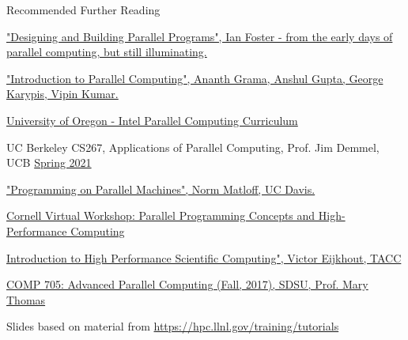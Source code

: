 \documentclass[10pt,t]{beamer}
\begin{document}
%

\begin{frame}{Recommended Further Reading}
  \begin{itemize}
  \small{
    \item \href{http://www.mcs.anl.gov/~itf/dbpp/}{"Designing and Building Parallel Programs", Ian Foster - from the early days of parallel computing, but still illuminating.}
    \item \href{http://www-users.cs.umn.edu/~karypis/parbook/}{"Introduction to Parallel Computing", Ananth Grama, Anshul Gupta, George Karypis, Vipin Kumar.}
    \item \href{https://ipcc.cs.uoregon.edu/curriculum.html}{University of Oregon - Intel Parallel Computing Curriculum}
    \item UC Berkeley CS267, Applications of Parallel Computing, Prof. Jim Demmel, UCB \href{https://sites.google.com/lbl.gov/cs267-spr2021}{Spring 2021}
    \item \href{http://heather.cs.ucdavis.edu/~matloff/158/PLN/ParProcBookS2011.pdf}{"Programming on Parallel Machines", Norm Matloff, UC Davis.}
    \item \href{https://cvw.cac.cornell.edu/Parallel/}{Cornell Virtual Workshop: Parallel Programming Concepts and High-Performance Computing}
    \item \href{https://pages.tacc.utexas.edu/~eijkhout/istc/istc.html}{Introduction to High Performance Scientific Computing", Victor Eijkhout, TACC}
    \item \href{https://edoras.sdsu.edu/~mthomas/f17.705}{COMP 705: Advanced Parallel Computing (Fall, 2017), SDSU, Prof. Mary Thomas}
    \item Slides based on material from \url{https://hpc.llnl.gov/training/tutorials}
  }
  \end{itemize}
\end{frame}
\end{document}
